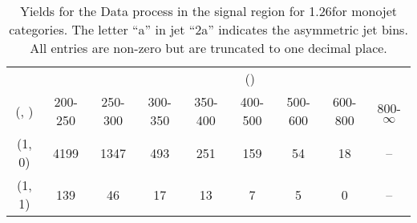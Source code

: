 \begin{table}[h!]
\tiny
\centering
\caption{Yields for the Data process in the signal region for 1.26\ifb for monojet categories. The letter ``a'' in jet \eg ``2a''  indicates the asymmetric jet bins. All entries are non-zero but are truncated to one decimal place.\label{tab:yieldssep_sig_data_mono}}
\begin{tabular}
{ccccccccc}
	\hline\hline
&	& \multicolumn{8}{c}{\scalht (\gev)} \\ 
	 (\njet,  \nb) & 200-250 & 250-300 & 300-350 & 350-400 & 400-500 & 500-600 & 600-800 & 800-$\infty$ \\ [0.8ex] 
\hline
	(1, 0) & 4199 & 1347 & 493 & 251 & 159 & 54 & 18 & -- \\[0.5ex] 
	(1, 1) & 139 & 46 & 17 & 13 & 7 & 5 & 0 & -- \\[0.5ex] 
	\hline
	\hline
\end{tabular}
\end{table}
